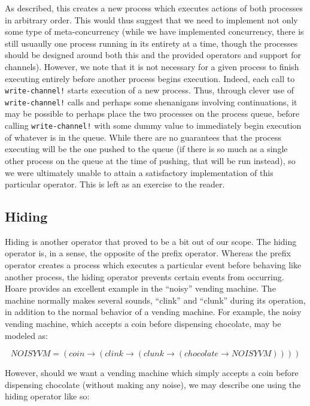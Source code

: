 \documentclass{article}
\begin{document}
As described, this creates a new process which executes actions of both
processes in arbitrary order. This would thus suggest that we need to
implement not only some type of meta-concurrency (while we have implemented
concurrency, there is still usuaully one process running in its entirety
at a time, though the processes should be designed around both this and the
provided operators and support for channels). However, we note that it is
not necessary for a given process to finish executing entirely before 
another process begins execution. Indeed, each call to \texttt{write-channel!} starts execution of a new process. Thus, through
clever use of \texttt{write-channel!} calls and perhaps some shenanigans
involving continuations, it may be possible to perhaps place the two 
processes on the process queue, before calling \texttt{write-channel!} 
with some dummy value to immediately begin execution of whatever is in the
queue. While there are no guarantees that the process executing will be
the one pushed to the queue (if there is so much as a single other process
on the queue at the time of pushing, that will be run instead), so we were
ultimately unable to attain a satisfactory implementation of this 
particular operator. This is left as an exercise to the reader.

\subsection*{Hiding}

Hiding is another operator that proved to be a bit out of our scope. The
hiding operator is, in a sense, the opposite of the prefix operator. 
Whereas the prefix operator creates a process which executes a particular
event before behaving like another process, the hiding operator prevents
certain events from occurring. Hoare provides an excellent example in the
``noisy'' vending machine. The machine normally makes several sounds,
``clink'' and ``clunk'' during its operation, in addition to the normal
behavior of a vending machine. For example, the noisy vending machine, 
which accepts a coin before dispensing chocolate, may be modeled as:

\[ NOISYVM = (coin \rightarrow (clink \rightarrow (clunk \rightarrow (chocolate \rightarrow NOISYVM)))) \]

However, should we want a vending machine which simply accepts a coin 
before dispensing chocolate (without making any noise), we may describe one
using the hiding operator like so:
\end{document}
